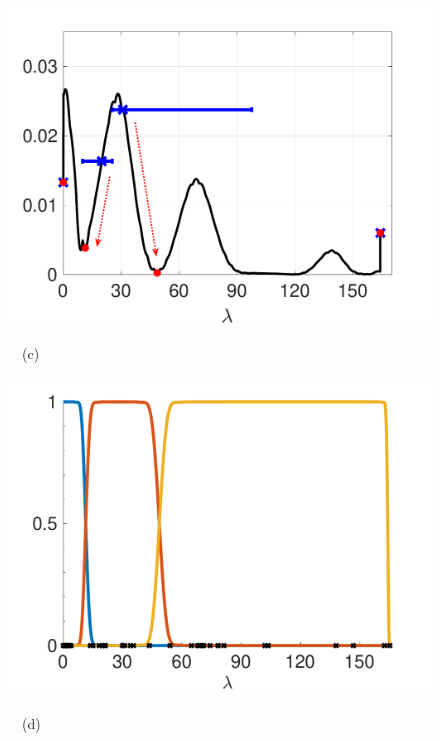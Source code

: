 \documentclass[journal, 10pt]{IEEEtran}
\begin{document}
\begin{figure}[tb]
\begin{minipage}[m]{0.49\linewidth}
\centerline{\includegraphics[width=1.1\linewidth]{fig_pdf}}
\centerline{~~\small{(c)}}
\end{minipage}
\begin{minipage}[m]{0.49\linewidth}
\centerline{\includegraphics[width=1.1\linewidth]{fig_updated_fb}}
\centerline{~~\small{(d)}}
\end{minipage}

\end{figure}
\end{document}
